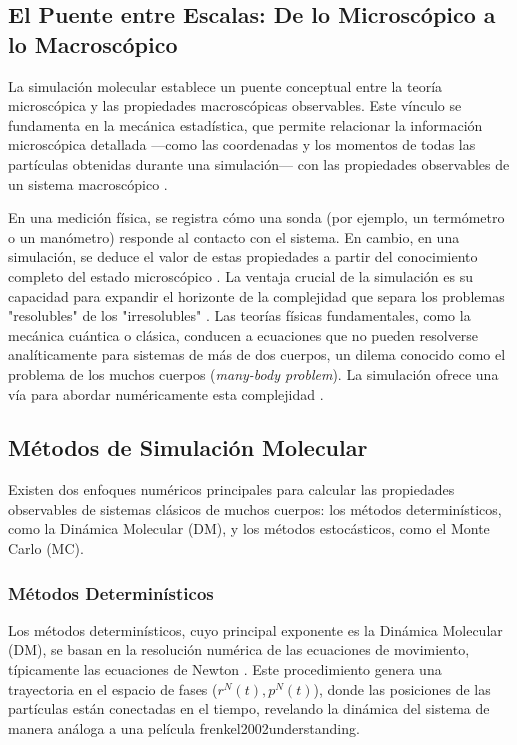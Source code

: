 \subsection{El Puente entre Escalas: De lo Microscópico a lo Macroscópico}

La simulación molecular establece un puente conceptual entre la teoría microscópica y las propiedades macroscópicas observables. Este vínculo se fundamenta en la mecánica estadística, que permite relacionar la información microscópica detallada —como las coordenadas y los momentos de todas las partículas obtenidas durante una simulación— con las propiedades observables de un sistema macroscópico \cite[125]{frenkel2002understanding}.

En una medición física, se registra cómo una sonda (por ejemplo, un termómetro o un manómetro) responde al contacto con el sistema. En cambio, en una simulación, se deduce el valor de estas propiedades a partir del conocimiento completo del estado microscópico \cite[125]{frenkel2002understanding}. La ventaja crucial de la simulación es su capacidad para expandir el horizonte de la complejidad que separa los problemas "resolubles" de los "irresolubles" \cite[3]{MD-2001-01}. Las teorías físicas fundamentales, como la mecánica cuántica o clásica, conducen a ecuaciones que no pueden resolverse analíticamente para sistemas de más de dos cuerpos, un dilema conocido como el problema de los muchos cuerpos (\textit{many-body problem}). La simulación ofrece una vía para abordar numéricamente esta complejidad \cite[3]{MD-2001-01}.

\subsection{Métodos de Simulación Molecular}

Existen dos enfoques numéricos principales para calcular las propiedades observables de sistemas clásicos de muchos cuerpos: los métodos determinísticos, como la Dinámica Molecular (DM), y los métodos estocásticos, como el Monte Carlo (MC).

\subsubsection{Métodos Determinísticos}
Los métodos determinísticos, cuyo principal exponente es la Dinámica Molecular (DM), se basan en la resolución numérica de las ecuaciones de movimiento, típicamente las ecuaciones de Newton \cite[28]{haile1992molecular}. Este procedimiento genera una trayectoria en el espacio de fases ($r^N(t), p^N(t)$), donde las posiciones de las partículas están conectadas en el tiempo, revelando la dinámica del sistema de manera análoga a una película \cite[28, 53]{haile1992molecular}{frenkel2002understanding}.


